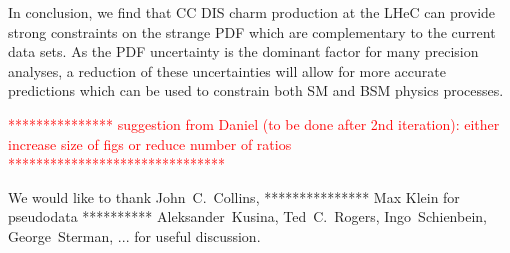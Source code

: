 \documentclass[pdftex,twocolumn,epjc3]{svjour3}          %
\begin{document}
%
In conclusion, we find that CC DIS charm production at the LHeC can
provide strong constraints on the strange PDF which are complementary
to the current data sets.
%
As the PDF uncertainty is the dominant factor for many precision
analyses, a reduction of these uncertainties will allow for more
accurate predictions which can be used to constrain both SM and BSM
physics processes.



\textcolor{red}{
*************** suggestion from Daniel (to be done after 2nd iteration):
either increase  size of figs or reduce  number of ratios
*******************************
}

\begin{acknowledgements}

We would like to thank
John~C.~Collins,
*************** Max Klein for pseudodata **********
Aleksander~Kusina,
Ted~C.~Rogers,
Ingo~Schienbein,
George~Sterman,
...
for useful discussion.

\end{acknowledgements}





\end{document}
